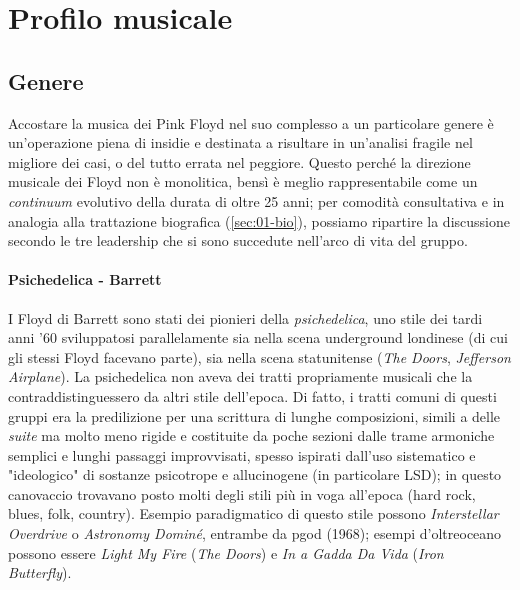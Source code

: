 \documentclass[class=book, crop=false, oneside, 12pt]{standalone}
\begin{document}
    \section{Profilo musicale}\label{sec:01-musicianship}
    
    \subsection{Genere}
    Accostare la musica dei Pink Floyd nel suo complesso a un particolare genere è un'operazione piena di insidie e destinata a risultare in un'analisi fragile nel migliore dei casi, o del tutto errata nel peggiore. Questo perché la direzione musicale dei Floyd non è monolitica, bensì è meglio rappresentabile come un \emph{continuum} evolutivo della durata di oltre 25 anni; per comodità consultativa e in analogia alla trattazione biografica (\ref{sec:01-bio}), possiamo ripartire la discussione secondo le tre leadership che si sono succedute nell'arco di vita del gruppo.

    \paragraph{Psichedelica - Barrett}
    I Floyd di Barrett sono stati dei pionieri della \emph{psichedelica}, uno stile dei tardi anni '60 sviluppatosi parallelamente sia nella scena underground londinese (di cui gli stessi Floyd facevano parte), sia nella scena statunitense (\emph{The Doors}, \emph{Jefferson Airplane}). La psichedelica non aveva dei tratti propriamente musicali che la contraddistinguessero da altri stile dell'epoca. Di fatto, i tratti comuni di questi gruppi era la predilizione per una scrittura di lunghe composizioni, simili a delle \emph{suite} ma molto meno rigide e costituite da poche sezioni dalle trame armoniche semplici e lunghi passaggi improvvisati, spesso ispirati dall'uso sistematico e "ideologico" di sostanze psicotrope e allucinogene (in particolare LSD); in questo canovaccio trovavano posto molti degli stili più in voga all'epoca (hard rock, blues, folk, country). Esempio paradigmatico di questo stile possono \emph{Interstellar Overdrive} o \emph{Astronomy Dominé}, entrambe da \acrshort{pgod} (1968); esempi d'oltreoceano possono essere \emph{Light My Fire} (\emph{The Doors}) e \emph{In a Gadda Da Vida} (\emph{Iron Butterfly}).
\end{document}
